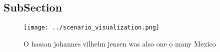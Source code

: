 \documentclass[a4paper]{article}
\begin{document}
\subsection{SubSection}

\begin{figure}
\centering
\texttt{[image: ../scenario\_visualization.png]}
\caption{O hassan johannes vilhelm jensen was also one o many Mexico
}
\end{figure}
 
\end{document}
